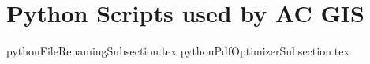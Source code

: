 
\section[Python Tools]{Python Scripts used by AC GIS}
{pythonFileRenamingSubsection.tex}
{pythonPdfOptimizerSubsection.tex}

